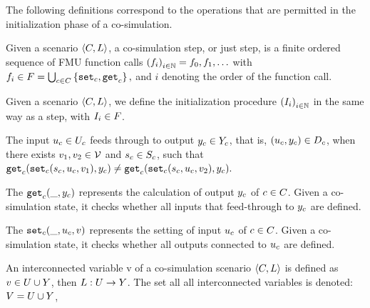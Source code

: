 The following definitions correspond to the operations that are permitted in the initialization phase of a co-simulation.

\begin{definition}[Step]\label{def:cosim_step}
  Given a scenario $ \left\langle C, L \right\rangle $, a co-simulation step, or just step, is a finite ordered sequence of FMU function calls $ \left( f_i \right)_{i \in \mathbb{N}} = f_0, f_1, \ldots$ with
  $f_i \in F = \bigcup_{c \in C}  \left\{ \mathtt{set}_{c},\mathtt{get}_{c} \right\},$
  and $i$ denoting the order of the function call.
\end{definition}

\begin{definition}[Initialization]\label{def:initialization}
  Given a scenario $ \left\langle C, L \right\rangle $, we define the initialization procedure $ \left( I_i \right)_{i \in \mathbb{N}}$ in the same way as a step, with $I_i \in F$.
\end{definition}

\begin{definition}\label{def:feedthrough}
  The input $u_{c} \in U_{c}$ feeds through to output $y_{c} \in Y_{c}$, that is, $(u_{c},y_{c}) \in D_{c}$, when there exists $v_1, v_2 \in \mathcal{V}$ and $s_{c} \in S_{c}$, such that
  $
  \mathtt{get}_{c} (\mathtt{set}_{c}(s_{c}, u_{c}, v_1), y_{c}) \neq \mathtt{get}_{c} (\mathtt{set}_{c}(s_{c}, u_{c}, v_2), y_{c}).
  $
\end{definition}

\begin{definition}\label{def:getout}
The $\mathtt{get}_{c}(\_, y_{c})$ represents the calculation of output $y_{c}$ of $c \in C$. Given a co-simulation state, it checks whether all inputs that feed-through to $y_{c}$ are defined.
\end{definition}

\begin{definition}\label{def:setin}
The $\mathtt{set}_{c}(\_, u_{c}, v)$ represents the setting of input $u_{c}$  of $c \in C$. Given a co-simulation state, it checks whether all outputs connected to $u_{c}$ are defined.
\end{definition}

\begin{definition}
An interconnected variable v of a co-simulation scenario $ \left\langle C, L \right\rangle $ is defined as $v \in U \cup Y$, then $L : U \to Y$.
The set all all interconnected variables is denoted: $V = U \cup Y$,
\end{definition}

